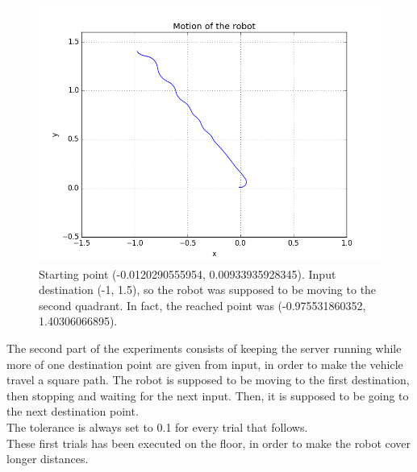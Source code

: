 \documentclass[a4paper,11pt,oneside]{book}
\begin{document}
\begin{figure}[H]
\begin{center}
\includegraphics[width=1\textwidth]{figs/experiments/4}
\caption[Experiment: Destination (-1, 1.5)]{Starting point (-0.0120290555954, 0.00933935928345). Input destination (-1, 1.5), so the robot was supposed to be moving to the second quadrant. In fact, the reached point was (-0.975531860352, 1.40306066895).}
\end{center}
\end{figure}

The second part of the experiments consists of keeping the server running while more of one destination point are given from input, in order to make the vehicle travel a square path. The robot is supposed to be moving to the first destination, then stopping and waiting for the next input. Then, it is supposed to be going to the next destination point.
\\ The tolerance is always set to 0.1 for every trial that follows.
\\ These first trials has been executed on the floor, in order to make the robot cover longer distances.
\end{document}
